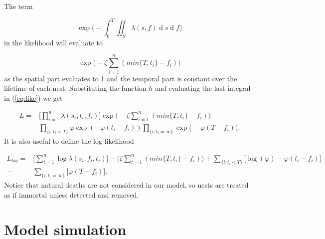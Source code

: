 \documentclass{article}
\renewcommand{\d}[1]{\ensuremath{\operatorname{d}\!{#1}}}
\begin{document}
The term 

\begin{equation*}
    \exp \bigg(- \int_{0}^{T} \iint_{S} \lambda(s, f)\d s \d f \bigg)
\end{equation*}
in the likelihood will evaluate to 

\begin{equation*}
    \exp \bigg(- \zeta \sum_{i=1}^{n} (min\{ T, t_i \} - f_i) \bigg)
\end{equation*}
as the spatial part evaluates to 1 and the temporal part is constant over the lifetime of each nest. Substituting the function $h$ and evaluating the last integral in (\ref{eq:like}) we get

\begin{equation*}
    \begin{aligned}
        L = & \Bigg[ \prod_{i = 1}^{n} \lambda(s_{i}, t_{i}, f_{i}) \Bigg] \exp \bigg(- \zeta \sum_{i=1}^{n} (min\{ T, t_i \} - f_i) \bigg) \\ 
        & \prod_{\{ i : t_{i} < T \} } \varphi \exp (- \varphi (t_{i} - f_{i})) \prod_{ \{ i : t_{i} = \infty \} } \exp \bigg( - \varphi(T - f_{i}) \bigg).
    \end{aligned}
\end{equation*}
It is also useful to define the log-likelihood

\begin{equation*}
    \begin{aligned}
        L_{log} = & \Bigg[ \sum_{i = 1}^{n} \log \lambda(s_{i},f_{i}, t_{i}) \Bigg] - \bigg(\zeta \sum_{i=1}^{n} (min\{ T, t_i \} - f_i) \bigg)  + \sum_{\{ i : t_{i} < T \} }  \bigg[\log (\varphi) -\varphi(t_{i} - f_{i}) \bigg] \\
        - & \sum_{ \{ i : t_{i} = \infty \} } \bigg[\varphi(T - f_{i}) \bigg].
    \end{aligned}
\end{equation*}
Notice that natural deaths are not considered in our model, so nests are treated as if immortal unless detected and removed.






\section{Model simulation} \label{section:simulationModel}
\end{document}
